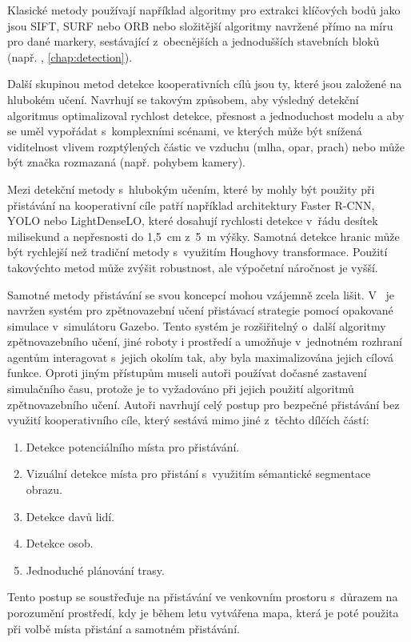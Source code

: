     Klasické metody používají například algoritmy pro extrakci klíčových bodů jako jsou SIFT, SURF nebo ORB \cite{Saavedra2021} nebo složitější algoritmy navržené přímo na míru pro dané markery, sestávající z~obecnějších a jednodušších stavebních bloků (např. \cite{apriltag3}, \cref{chap:detection}). 
    
    Další skupinou metod detekce kooperativních cílů jsou ty, které jsou založené na hlubokém učení. Navrhují se takovým způsobem, aby výsledný detekční algoritmus optimalizoval rychlost detekce, přesnost a jednoduchost modelu a aby se uměl vypořádat s~komplexními scénami, ve kterých může být snížená viditelnost vlivem rozptýlených částic ve vzduchu (mlha, opar, prach) nebo může být značka rozmazaná (např. pohybem kamery). \cite{Xin2022}
    
    Mezi detekční metody s~hlubokým učením, které by mohly být použity při přistávání na kooperativní cíle patří například architektury Faster R-CNN, YOLO nebo LightDense\-LO, které dosahují rychlosti detekce v~řádu desítek milisekund a nepřesnosti do 1{,}5~cm z~5~m výšky. Samotná detekce hranic může být rychlejší než tradiční metody s~využitím Houghovy transformace. Použití takovýchto metod může zvýšit robustnost, ale výpočetní náročnost je vyšší. \cite{Xin2022}

    Samotné metody přistávání se svou koncepcí mohou vzájemně zcela lišit. V~\cite{Rodriguez2019} je navržen systém pro zpětnovazební učení přistávací strategie pomocí opakované simulace v~simulátoru Gazebo. Tento systém je rozšiřitelný o~další algoritmy zpětnovazebního učení, jiné roboty i prostředí a umožňuje v~jednotném rozhraní agentům interagovat s~jejich okolím tak, aby byla maximalizována jejich cílová funkce. Oproti jiným přístupům museli autoři používat dočasné zastavení simulačního času, protože je to vyžadováno při jejich použití algoritmů zpětnovazebního učení. Autoři \cite{Kakaletsis2022} navrhují celý postup pro bezpečné přistávání bez využití kooperativního cíle, který sestává mimo jiné z~těchto dílčích částí:
    \begin{enumerate}
        \item Detekce potenciálního místa pro přistávání.
        \item Vizuální detekce místa pro přistání s~využitím sémantické segmentace obrazu.
        \item Detekce davů lidí.
        \item Detekce osob.
        \item Jednoduché plánování trasy.
    \end{enumerate}
    Tento postup se soustřeďuje na přistávání ve venkovním prostoru s~důrazem na porozumění prostředí, kdy je během letu vytvářena mapa, která je poté použita při volbě místa přistání a samotném přistávání.

